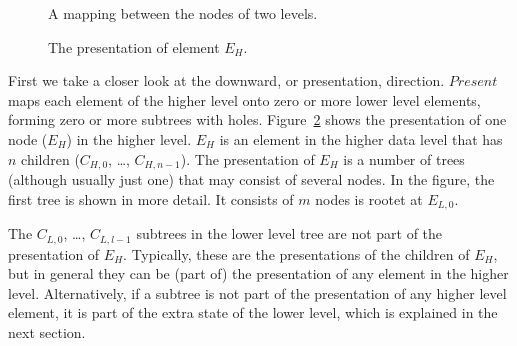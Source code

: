 \begin{figure}
\begin{center}
\begin{center}
%
% 
%
%
% 
\end{center}
\caption{A mapping between the nodes of two levels.}\label{nodeMapping} 
\end{center}
\end{figure}


\begin{figure}
\begin{center}
\begin{center}
%                    
\end{center}
\caption{The presentation of element $E_H$.}\label{elementPresentation} 
\end{center}
\end{figure}

First we take a closer look at the downward, or presentation, direction. $Present$ maps each element of the higher level onto zero or more lower level elements, forming zero or more subtrees with holes.  Figure~\ref{elementPresentation} shows the presentation of one node ($E_H$) in the higher level. $E_H$ is an element in the higher data level that has $n$ children ($C_{H,0}$, \dots, $C_{H,n-1}$). The presentation of $E_H$ is a number of trees (although usually just one) that may consist of several nodes. In the figure, the first tree is shown in more detail. It consists of $m$ nodes is rootet at $E_{L,0}$. 

The $C_{L,0}$, \dots, $C_{L,l-1}$ subtrees in the lower level tree are not part of the presentation of $E_H$. Typically, these are the presentations of the children of $E_H$, but in general they can be (part of) the presentation of any element in the higher level. Alternatively, if a subtree is not part of the presentation of any higher level element, it is part of the extra state of the lower level, which is explained in the next section.

